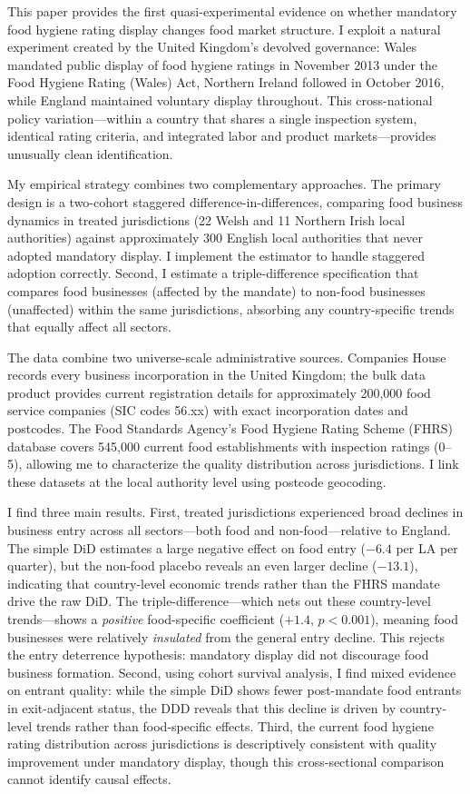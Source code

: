 \documentclass[12pt]{article}
\begin{document}
This paper provides the first quasi-experimental evidence on whether mandatory food hygiene rating display changes food market structure. I exploit a natural experiment created by the United Kingdom's devolved governance: Wales mandated public display of food hygiene ratings in November 2013 under the Food Hygiene Rating (Wales) Act, Northern Ireland followed in October 2016, while England maintained voluntary display throughout. This cross-national policy variation---within a country that shares a single inspection system, identical rating criteria, and integrated labor and product markets---provides unusually clean identification.

My empirical strategy combines two complementary approaches. The primary design is a two-cohort staggered difference-in-differences, comparing food business dynamics in treated jurisdictions (22 Welsh and 11 Northern Irish local authorities) against approximately 300 English local authorities that never adopted mandatory display. I implement the \citet{callaway2021difference} estimator to handle staggered adoption correctly. Second, I estimate a triple-difference specification that compares food businesses (affected by the mandate) to non-food businesses (unaffected) within the same jurisdictions, absorbing any country-specific trends that equally affect all sectors.

The data combine two universe-scale administrative sources. Companies House records every business incorporation in the United Kingdom; the bulk data product provides current registration details for approximately 200,000 food service companies (SIC codes 56.xx) with exact incorporation dates and postcodes. The Food Standards Agency's Food Hygiene Rating Scheme (FHRS) database covers 545,000 current food establishments with inspection ratings (0--5), allowing me to characterize the quality distribution across jurisdictions. I link these datasets at the local authority level using postcode geocoding.

I find three main results. First, treated jurisdictions experienced broad declines in business entry across all sectors---both food and non-food---relative to England. The simple DiD estimates a large negative effect on food entry ($-6.4$ per LA per quarter), but the non-food placebo reveals an even larger decline ($-13.1$), indicating that country-level economic trends rather than the FHRS mandate drive the raw DiD. The triple-difference---which nets out these country-level trends---shows a \textit{positive} food-specific coefficient ($+1.4$, $p < 0.001$), meaning food businesses were relatively \textit{insulated} from the general entry decline. This rejects the entry deterrence hypothesis: mandatory display did not discourage food business formation. Second, using cohort survival analysis, I find mixed evidence on entrant quality: while the simple DiD shows fewer post-mandate food entrants in exit-adjacent status, the DDD reveals that this decline is driven by country-level trends rather than food-specific effects. Third, the current food hygiene rating distribution across jurisdictions is descriptively consistent with quality improvement under mandatory display, though this cross-sectional comparison cannot identify causal effects.
\end{document}
